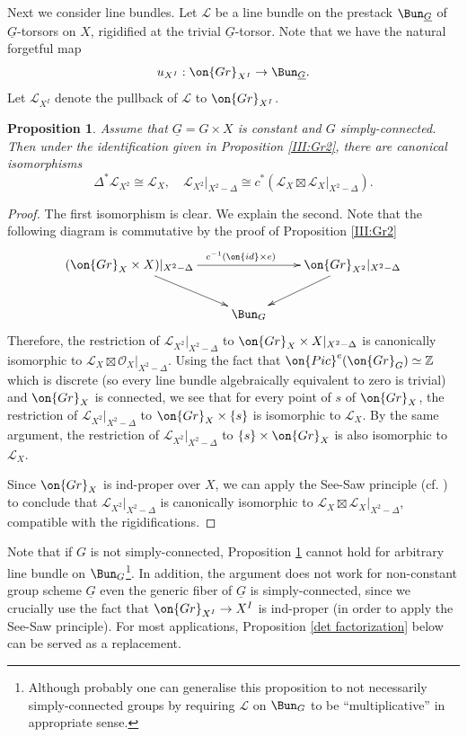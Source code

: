 \documentclass[]{pcmi}
\theoremstyle{plain}
\newtheorem{prop}[equation]{Proposition}
\theoremstyle{remark}
\theoremstyle{definition}
\newcommand{\bZ}{{\mathbb Z}}
\newcommand{\mL}{{\mathcal L}}
\newcommand{\mO}{{\mathcal O}}
\newcommand{\Gr}{{\on{Gr}}}
\newcommand{\id}{{\on{id}}}
\newcommand{\Pic}{{\on{Pic}}}
\begin{document}
Next we consider line bundles. Let $\mL$ be a line bundle on the prestack $\Bun_{\underline G}$ of $\underline G$-torsors on $X$, rigidified at the trivial $\underline G$-torsor. Note that we have the natural forgetful map
\begin{equation}\label{III:I-un}
u_{X^I}: \Gr_{X^I}\to \Bun_{\underline G}.
\end{equation}
Let $\mL_{X^I}$ denote the pullback of $\mL$ to $\Gr_{X^I}$.

\begin{prop}\label{III:line}
Assume that $\underline G=G\times X$ is constant and $G$ simply-connected. Then under the identification given in Proposition \ref{III:Gr2}, there are canonical isomorphisms
\[\Delta^*\mL_{X^2}\cong \mL_{X}, \quad \mL_{X^2}|_{X^2-\Delta}\cong c^*(\mL_X\boxtimes\mL_X|_{X^2-\Delta}).\]
\end{prop}
\begin{proof}
The first isomorphism is clear. We explain the second. Note that the following diagram is commutative by the proof of Proposition \ref{III:Gr2}
\[\xymatrix{
(\Gr_X\times X)|_{X^2-\Delta}\ar^{c^{-1}(\id\times e)}[rr]\ar[dr]&&\Gr_{X^2}|_{X^2-\Delta}\ar[dl]\\
&\Bun_G&
}\]
Therefore, the restriction of $\mL_{X^2}|_{X^2-\Delta}$ to $\Gr_X\times X|_{X^2-\Delta}$ is canonically isomorphic to $\mL_X\boxtimes\mO_{X}|_{X^2-\Delta}$. Using the fact that $\Pic^e(\Gr_G)\simeq \bZ$  which is discrete (so every line bundle algebraically equivalent to zero is trivial) and $\Gr_X$ is connected, we see that for every point of $s$ of $\Gr_X$, the restriction of $\mL_{X^2}|_{X^2-\Delta}$ to $\Gr_X\times\{s\}$ is isomorphic to $\mL_X$. By the same argument, the restriction of $\mL_{X^2}|_{X^2-\Delta}$ to $\{s\}\times \Gr_X$ is also isomorphic to $\mL_X$.

Since $\Gr_X$ is ind-proper over $X$, we can apply the See-Saw principle (cf. \cite[\S 5]{Mum}) to conclude that $\mL_{X^2}|_{X^2-\Delta}$ is canonically isomorphic to $\mL_X\boxtimes\mL_X|_{X^2-\Delta}$, compatible with the rigidifications.
\end{proof}


Note that if $G$ is not simply-connected, Proposition \ref{III:line} cannot hold for arbitrary line bundle on $\Bun_G$\footnote{Although probably one can generalise this proposition to not necessarily simply-connected groups by requiring $\mL$ on $\Bun_G$ to be ``multiplicative'' in appropriate sense.}. In addition, the argument does not work for non-constant group scheme $\underline G$ even the generic fiber of $\underline G$ is simply-connected,  since we crucially use the fact that $\Gr_{X^I}\to X^I$ is ind-proper (in order to apply the See-Saw principle). For most applications, Proposition \ref{det factorization} below can be served as a replacement.
\end{document}
